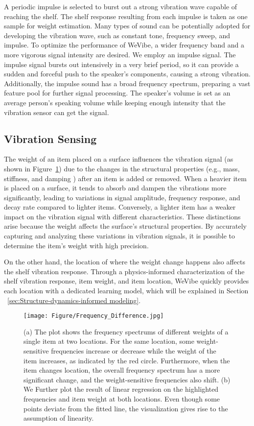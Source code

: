 A periodic impulse is selected to burst out a strong vibration wave capable of reaching the shelf. The shelf response resulting from each impulse is taken as one sample for weight estimation. Many types of sound can be potentially adopted for developing the vibration wave, such as constant tone, frequency sweep, and impulse. To optimize the performance of WeVibe, a wider frequency band and a more vigorous signal intensity are desired. We employ an impulse signal. The impulse signal bursts out intensively in a very brief period, so it can provide a sudden and forceful push to the speaker's components, causing a strong vibration. Additionally, the impulse sound has a broad frequency spectrum, preparing a vast feature pool for further signal processing. The speaker's volume is set as an average person's speaking volume while keeping enough intensity that the vibration sensor can get the signal.


\subsection{Vibration Sensing}
\label{sec: vibration sensing}
The weight of an item placed on a surface influences the vibration signal (as shown in Figure~\ref{fig:frequency difference}) due to the changes in the structural properties (e.g., mass, stiffness, and damping ) after an item is added or removed. When a heavier item is placed on a surface, it tends to absorb and dampen the vibrations more significantly, leading to variations in signal amplitude, frequency response, and decay rate compared to lighter items. Conversely, a lighter item has a weaker impact on the vibration signal with different characteristics. These distinctions arise because the weight affects the surface's structural properties. By accurately capturing and analyzing these variations in vibration signals, it is possible to determine the item's weight with high precision.

On the other hand, the location of where the weight change happens also affects the shelf vibration response. Through a physics-informed characterization of the shelf vibration response, item weight, and item location, WeVibe quickly provides each location with a dedicated learning model, which will be explained in Section ~\ref{sec:Structure-dynamics-informed modeling}.

\begin{figure}
    \centering
    \texttt{[image: Figure/Frequency\_Difference.jpg]}
    \caption{(a) The plot shows the frequency spectrums of different weights of a single item at two locations. For the same location, some weight-sensitive frequencies increase or decrease while the weight of the item increases, as indicated by the red circle. Furthermore, when the item changes location, the overall frequency spectrum has a more significant change, and the weight-sensitive frequencies also shift. (b) We Further plot the result of linear regression on the highlighted frequencies and item weight at both locations. Even though some points deviate from the fitted line, the visualization gives rise to the assumption of linearity.}
    \label{fig:frequency difference}
\end{figure}

